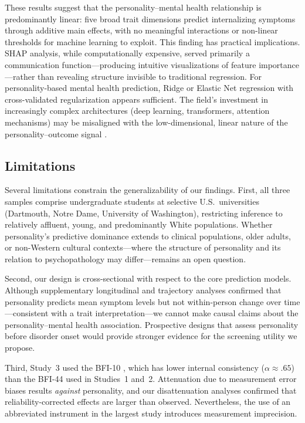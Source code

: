 \documentclass[12pt, a4paper]{article}
\begin{document}
These results suggest that the personality--mental health relationship is predominantly linear: five broad trait dimensions predict internalizing symptoms through additive main effects, with no meaningful interactions or non-linear thresholds for machine learning to exploit. This finding has practical implications. SHAP analysis, while computationally expensive, served primarily a communication function---producing intuitive visualizations of feature importance---rather than revealing structure invisible to traditional regression. For personality-based mental health prediction, Ridge or Elastic Net regression with cross-validated regularization appears sufficient. The field's investment in increasingly complex architectures (deep learning, transformers, attention mechanisms) may be misaligned with the low-dimensional, linear nature of the personality--outcome signal \citep{roberts2007power}.

\subsection{Limitations}

Several limitations constrain the generalizability of our findings. First, all three samples comprise undergraduate students at selective U.S.\ universities (Dartmouth, Notre Dame, University of Washington), restricting inference to relatively affluent, young, and predominantly White populations. Whether personality's predictive dominance extends to clinical populations, older adults, or non-Western cultural contexts---where the structure of personality and its relation to psychopathology may differ---remains an open question.

Second, our design is cross-sectional with respect to the core prediction models. Although supplementary longitudinal and trajectory analyses confirmed that personality predicts mean symptom levels but not within-person change over time---consistent with a trait interpretation---we cannot make causal claims about the personality--mental health association. Prospective designs that assess personality before disorder onset would provide stronger evidence for the screening utility we propose.

Third, Study~3 used the BFI-10 \citep{rammstedt2007measuring}, which has lower internal consistency ($\alpha \approx .65$) than the BFI-44 used in Studies~1 and~2. Attenuation due to measurement error biases results \textit{against} personality, and our disattenuation analyses confirmed that reliability-corrected effects are larger than observed. Nevertheless, the use of an abbreviated instrument in the largest study introduces measurement imprecision.
\end{document}
